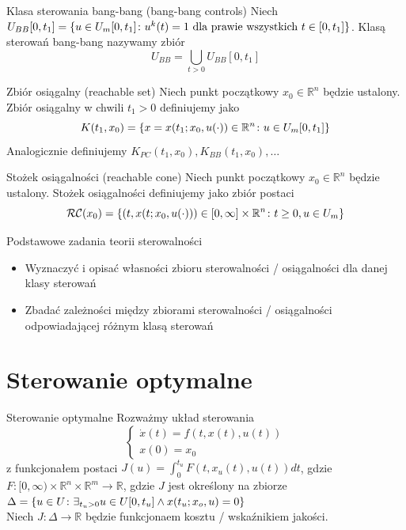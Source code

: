 \begin{definition}{Klasa sterowania bang-bang (bang-bang controls)}{}{}
    Niech $U_{BB}[0, t_1] = \{u \in U_m[0, t_1] \colon u^k(t) = 1 \text{ dla prawie wszystkich } t \in [0, t_1]\}$. Klasą sterowań bang-bang nazywamy zbiór 
    \[U_{BB} = \bigcup_{t > 0} U_{BB}[0, t_1]\]
\end{definition}

\begin{definition}{Zbiór osiągalny (reachable set)}{}{}
    Niech punkt początkowy $x_0 \in \mathbb{R}^n$ będzie ustalony. Zbiór osiągalny w chwili $t_1 > 0$ definiujemy jako $$K(t_1, x_0) = \{x = x(t_1; x_0, u(\cdot)) \in \mathbb{R}^n \colon u \in U_m[0, t_1]\}$$
    Analogicznie definiujemy $K_{PC}(t_1, x_0), K_{BB}(t_1, x_0), \dots$
\end{definition}

\begin{definition}{Stożek osiągalności (reachable cone)}{}{}
    Niech punkt początkowy $x_0 \in \mathbb{R}^n$ będzie ustalony. Stożek osiągalności definiujemy jako zbiór postaci $$\mathcal{RC}(x_0) = \{(t, x(t; x_0, u(\cdot))) \in [0, \infty] \times \mathbb{R}^n \colon t \geq 0, u \in U_m\}$$
\end{definition}

\begin{note}{Podstawowe zadania teorii sterowalności}{}{}
    \begin{itemize}
        \item Wyznaczyć i opisać własności zbioru sterowalności / osiągalności dla danej klasy sterowań
        \item Zbadać zależności między zbiorami sterowalności / osiągalności odpowiadającej różnym klasą sterowań
    \end{itemize}
\end{note}

\section{Sterowanie optymalne}

\begin{definition}{Sterowanie optymalne}{}{}
    Rozważmy układ sterowania \begin{equation}
        \begin{cases}
            \dot{x}(t) = f(t, x(t), u(t)) \\
            x(0) = x_0
        \end{cases}
    \end{equation}
    z funkcjonałem postaci $J(u) = \int_0^{t_u} F(t, x_u(t), u(t)) dt$, gdzie $F \colon [0, \infty) \times \mathbb{R}^n \times \mathbb{R}^m \to \mathbb{R}$, gdzie $J$ jest określony na zbiorze $\Delta = \{ u \in U \colon \exists_{t_u > 0} u \in U[0, t_u] \land x(t_u; x_o, u) = 0 \}$ \\
    Niech $J \colon \Delta \to \mathbb{R}$ będzie funkcjonaem kosztu / wskaźnikiem jakości.
\end{definition}

